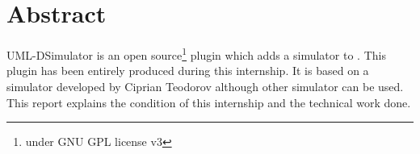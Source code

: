 \chapter*{Abstract}

UML-DSimulator is an open source\footnote{under GNU GPL license v3} plugin which adds a simulator to \umld. This plugin has been entirely produced during this internship. It is based on a simulator developed by Ciprian Teodorov although other simulator can be used. This report explains the condition of this internship and the technical work done.



